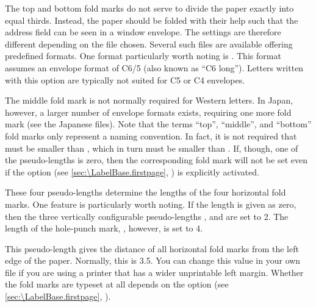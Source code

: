 The top and bottom fold marks do not serve to divide the
paper exactly into equal thirds. Instead, the paper should be folded with
their help such that the address field can be seen in a window envelope. The
settings are therefore different depending on the  file chosen.
Several such files are available offering predefined formats. One format
particularly worth noting is . This format assumes an
envelope format of C6/5 (also known as ``C6 long''). Letters written with this
option are typically not suited for C5 or C4 envelopes.

The middle fold mark is not normally required for Western letters. In Japan,
however, a larger number of envelope formats exists, requiring one more fold
mark (see the Japanese  files). Note that the terms ``top'',
``middle'', and ``bottom'' fold marks only represent a naming convention. In
fact, it is not required that  must be smaller than
, which in turn must be smaller than
. If, though, one of the pseudo-lengths is zero, then
the corresponding fold mark will not be set even if the
%
 option (see
\autoref{sec:\LabelBase.firstpage}, ) is
explicitly activated.
%
\EndIndexGroup


\begin{Declaration}
\end{Declaration}
These four pseudo-lengths determine the
lengths of the four horizontal fold marks. One feature is
particularly worth noting. If the length is given as zero, then the three
vertically configurable pseudo-lengths ,
 and  are set to 2.
The length of the hole-punch mark, , however, is set
to 4.%
\EndIndexGroup


\begin{Declaration}
\end{Declaration}
This pseudo-length gives the distance of all horizontal fold marks from the
left edge of the paper. Normally, this is 3.5. You
can change this value in your own  file if you are using a printer
that has a wider unprintable left margin. Whether the fold marks are typeset
at all depends on the option %
%
 (see
\autoref{sec:\LabelBase.firstpage}, ).
%
\EndIndexGroup



